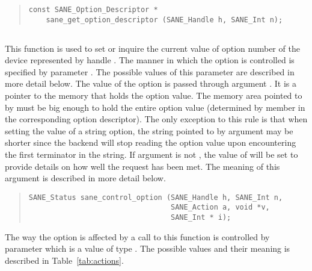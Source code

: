 \documentclass[11pt,DVIps]{report}
\begin{document}
\begin{quote}
\begin{verbatim}
const SANE_Option_Descriptor *
    sane_get_option_descriptor (SANE_Handle h, SANE_Int n);
\end{verbatim}
\end{quote}

\subsection{}\label{sec:control}

This function is used to set or inquire the current value of option
number  of the device represented by handle .  The
manner in which the option is controlled is specified by parameter
.  The possible values of this parameter are described in more
detail below.  The value of the option is passed through argument
.  It is a pointer to the memory that holds the option value.
The memory area pointed to by  must be big enough to hold the
entire option value (determined by member  in the
corresponding option descriptor).  The only exception to this rule is
that when setting the value of a string option, the string pointed to
by argument  may be shorter since the backend will stop
reading the option value upon encountering the first 
terminator in the string.  If argument  is not ,
the value of  will be set to provide details on how well the
request has been met.  The meaning of this argument is described in
more detail below.
\begin{quote}
\begin{verbatim}
SANE_Status sane_control_option (SANE_Handle h, SANE_Int n,
                                 SANE_Action a, void *v,
                                 SANE_Int * i);
\end{verbatim}
\end{quote}

The way the option is affected by a call to this function is
controlled by parameter  which is a value of type
.  The possible values and their meaning is
described in Table~\ref{tab:actions}.
\end{document}
